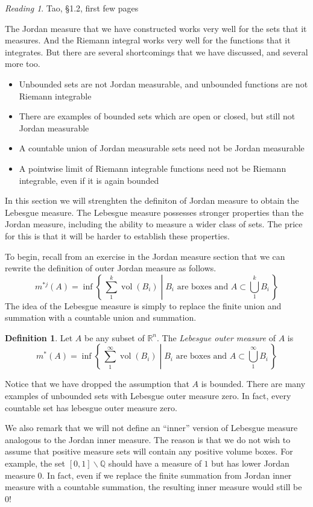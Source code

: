 \documentclass[11pt,oneside]{amsbook}
\newcommand{\set}[1]{\left\{\,#1\,\right\}}
\renewcommand{\setminus}{\smallsetminus}
\newcommand{\QQ}{{\mathbb Q}}
\newcommand{\RR}{{\mathbb R}}
\DeclareMathOperator{\vol}{vol}
\theoremstyle{definition}
\theoremstyle{plain}
\theoremstyle{definition}
\newtheorem{defn}[thm]{Definition}
\theoremstyle{remark}
\newtheorem*{reading}{Reading}
\numberwithin{equation}{section}
\numberwithin{figure}{section}
\begin{document}
\begin{reading}
  Tao, \S1.2, first few pages
\end{reading}

The Jordan measure that we have constructed works very well for the sets that it measures. And the Riemann integral works very well for the functions that it integrates. But there are several shortcomings that we have discussed, and several more too.
\begin{itemize}
\item Unbounded sets are not Jordan measurable, and unbounded functions are not Riemann integrable
\item There are examples of bounded sets which are open or closed, but still not Jordan measurable
\item A countable union of Jordan measurable sets need not be Jordan measurable
\item A pointwise limit of Riemann integrable functions need not be Riemann integrable, even if it is again bounded
\end{itemize}

In this section we will strenghten the definiton of Jordan measure to obtain the Lebesgue measure. The Lebesgue measure possesses stronger properties than the Jordan measure, including the ability to measure a wider class of sets. The price for this is that it will be harder to establish these properties.

To begin, recall from an exercise in the Jordan measure section that we can rewrite the definition of outer Jordan measure as follows.
\[m^{*j}(A)=\inf\set{\left.\sum_1^k \vol(B_i)\;\right|\;\text{$B_i$ are boxes and }A\subset\bigcup_1^kB_i}
\]
The idea of the Lebesgue measure is simply to replace the finite union and summation with a countable union and summation.

\begin{defn}
  Let $A$ be any subset of $\RR^n$. The \emph{Lebesgue outer measure} of $A$ is
  \[m^*(A)=\inf\set{\left.\sum_1^\infty \vol(B_i)\;\right|\;\text{$B_i$ are boxes and }A\subset\bigcup_1^\infty B_i}
  \]
\end{defn}

Notice that we have dropped the assumption that $A$ is bounded. There are many examples of unbounded sets with Lebesgue outer measure zero. In fact, every countable set has lebesgue outer measure zero.

We also remark that we will not define an ``inner'' version of Lebesgue measure analogous to the Jordan inner measure. The reason is that we do not wish to assume that positive measure sets will contain any positive volume boxes. For example, the set $[0,1]\setminus\QQ$ should have a measure of $1$ but has lower Jordan measure $0$. In fact, even if we replace the finite summation from Jordan inner measure with a countable summation, the resulting inner measure would still be $0$!
\end{document}
